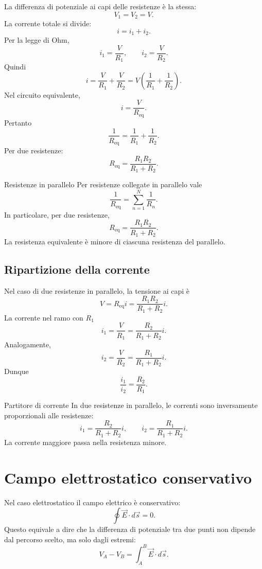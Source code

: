 \documentclass[a4paper]{article}
\begin{document}
La differenza di potenziale ai capi delle resistenze è la stessa:
\[
    V_1=V_2=V.
\]
La corrente totale si divide:
\[
    i=i_1+i_2.
\]
Per la legge di Ohm,
\[
    i_1=\frac{V}{R_1},
    \qquad
    i_2=\frac{V}{R_2}.
\]
Quindi
\[
    i=\frac{V}{R_1}+\frac{V}{R_2}=V\left(\frac{1}{R_1}+\frac{1}{R_2}\right).
\]
Nel circuito equivalente,
\[
    i=\frac{V}{R_{\mathrm{eq}}}.
\]
Pertanto
\[
    \frac{1}{R_{\mathrm{eq}}}=\frac{1}{R_1}+\frac{1}{R_2}.
\]
Per due resistenze:
\[
    R_{\mathrm{eq}}=\frac{R_1R_2}{R_1+R_2}.
\]

\begin{snippetproposition}{Resistenze in parallelo}
    Per resistenze collegate in parallelo vale
    \[
        \frac{1}{R_{\mathrm{eq}}}=\sum_{n=1}^N\frac{1}{R_n}.
    \]
    In particolare, per due resistenze,
    \[
        R_{\mathrm{eq}}=\frac{R_1R_2}{R_1+R_2}.
    \]
    La resistenza equivalente è minore di ciascuna resistenza del parallelo.
\end{snippetproposition}

\subsection{Ripartizione della corrente}

Nel caso di due resistenze in parallelo, la tensione ai capi è
\[
    V=R_{\mathrm{eq}}i=\frac{R_1R_2}{R_1+R_2}i.
\]
La corrente nel ramo con \(R_1\)
\[
    i_1=\frac{V}{R_1}=\frac{R_2}{R_1+R_2}i.
\]
Analogamente,
\[
    i_2=\frac{V}{R_2}=\frac{R_1}{R_1+R_2}i.
\]
Dunque
\[
    \frac{i_1}{i_2}=\frac{R_2}{R_1}.
\]

\begin{snippetproposition}{Partitore di corrente}
    In due resistenze in parallelo, le correnti sono inversamente proporzionali alle resistenze:
    \[
        i_1=\frac{R_2}{R_1+R_2}i,
        \qquad
        i_2=\frac{R_1}{R_1+R_2}i.
    \]
    La corrente maggiore passa nella resistenza minore.
\end{snippetproposition}

\section{Campo elettrostatico conservativo}

Nel caso elettrostatico il campo elettrico è conservativo:
\[
    \oint \vec{E}\cdot d\vec{s}=0.
\]
Questo equivale a dire che la differenza di potenziale tra due punti non dipende dal percorso scelto, ma solo dagli estremi:
\[
    V_A-V_B=\int_A^B \vec{E}\cdot d\vec{s}.
\]
\end{document}

